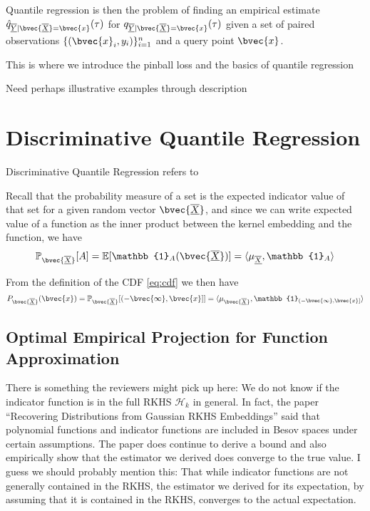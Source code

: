 \documentclass[twoside]{article} \usepackage{aistats2017}
\newcommand{\rv}[1]{\underline{\overline{#1}}}
\newcommand{\warn}[1]{{\color{red} #1}}
\begin{document}
		Quantile regression is then the problem of finding an empirical estimate $\hat{q}_{\rv{Y} | \bvec{\rv{X}} = \bvec{x}}(\tau)$ for $q_{\rv{Y} | \bvec{\rv{X}} = \bvec{x}}(\tau)$ given a set of paired observations $\{(\bvec{x}_{i}, y_{i})\}_{i = 1}^{n}$ and a query point $\bvec{x}$.
		
		\warn{This is where we introduce the pinball loss and the basics of quantile regression}
		
		\warn{Need perhaps illustrative examples through description}
		
\section{Discriminative Quantile Regression}

	Discriminative Quantile Regression refers to 
	
	Recall that the probability measure of a set is the expected indicator value of that set for a given random vector $\bvec{\rv{X}}$, and since we can write expected value of a function as the inner product between the kernel embedding and the function, we have
	\begin{equation}
		\mathbb{P}_{\bvec{\rv{X}}}[A] = \mathbb{E}[\mathbb{1}_{A}(\bvec{\rv{X}})] = \langle \mu_{\rv{X}}, \mathbb{1}_{A} \rangle
	\label{eq:distribution_inner}
	\end{equation}
	
	From the definition of the CDF \eqref{eq:cdf} we then have
	\begin{equation}
		P_{\bvec{\rv{X}}}(\bvec{x}) = \mathbb{P}_{\bvec{\rv{X}}}[(-\bvec{\infty}, \bvec{x}]] = \langle \mu_{\bvec{\rv{X}}}, \mathbb{1}_{(-\bvec{\infty}, \bvec{x}]} \rangle
	\label{eq:cdf_inner}
	\end{equation}
	
	\subsection{Optimal Empirical Projection for Function Approximation}
		
		\warn{There is something the reviewers might pick up here: We do not know if the indicator function is in the full RKHS $\mathcal{H}_{k}$ in general. In fact, the paper ``Recovering Distributions from Gaussian RKHS Embeddings'' said that polynomial functions and indicator functions are included in Besov spaces under certain assumptions. The paper does continue to derive a bound and also empirically show that the estimator we derived does converge to the true value. I guess we should probably mention this: That while indicator functions are not generally contained in the RKHS, the estimator we derived for its expectation, by assuming that it is contained in the RKHS, converges to the actual expectation.}
\end{document}
